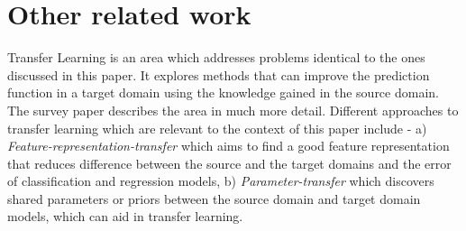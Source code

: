\documentclass[a4paper]{article}
\begin{document}



\section{Other related work}
Transfer Learning is an area which addresses problems identical to the ones discussed in this paper. It explores methods that can improve the prediction function in a target domain using the knowledge gained in the source domain. The survey paper \citep{Pan2010} describes the area in much more detail. Different approaches to transfer learning which are relevant to the context of this paper include - 
a) \textit{Feature-representation-transfer} which aims to find a good feature representation that reduces difference between the source and the target domains and the error of classification and regression models, b) \textit{Parameter-transfer} which discovers shared parameters or priors between the source domain and target domain models, which can aid in transfer learning.




\end{document}
